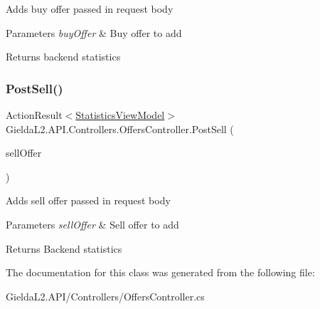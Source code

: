 Adds buy offer passed in request body 


\begin{DoxyParams}{Parameters}
{\em buy\+Offer} & Buy offer to add\\
\hline
\end{DoxyParams}
\begin{DoxyReturn}{Returns}
backend statistics
\end{DoxyReturn}
\mbox{\label{class_gielda_l2_1_1_a_p_i_1_1_controllers_1_1_offers_controller_a30bc8e1a4fcc81aa32fff84c054bfb3f}} 
\subsubsection{\texorpdfstring{PostSell()}{PostSell()}}
{\footnotesize\ttfamily Action\+Result$<$\mbox{\hyperlink{class_gielda_l2_1_1_a_p_i_1_1_view_models_1_1_view_1_1_statistics_view_model}{Statistics\+View\+Model}}$>$ Gielda\+L2.\+A\+P\+I.\+Controllers.\+Offers\+Controller.\+Post\+Sell (\begin{DoxyParamCaption}\item[{\mbox{[}\+From\+Body\mbox{]} \mbox{\hyperlink{class_gielda_l2_1_1_a_p_i_1_1_view_models_1_1_edit_1_1_edit_sell_offer_view_model}{Edit\+Sell\+Offer\+View\+Model}}}]{sell\+Offer }\end{DoxyParamCaption})}



Adds sell offer passed in request body 


\begin{DoxyParams}{Parameters}
{\em sell\+Offer} & Sell offer to add\\
\hline
\end{DoxyParams}
\begin{DoxyReturn}{Returns}
Backend statistics
\end{DoxyReturn}


The documentation for this class was generated from the following file\+:\begin{DoxyCompactItemize}
\item 
Gielda\+L2.\+A\+P\+I/\+Controllers/Offers\+Controller.\+cs\end{DoxyCompactItemize}
